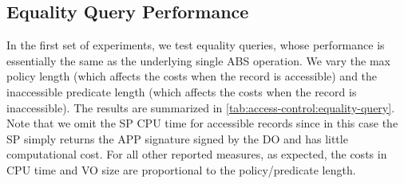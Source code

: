 \subsection{Equality Query Performance}

\begin{table}[t]
    \centering
    \caption{Equality Query Performance}\label{tab:access-control:equality-query}
\end{table}

In the first set of experiments, we test equality queries, whose performance is essentially the same as the underlying single ABS operation. We vary the max policy length (which affects the costs when the record is accessible) and the inaccessible predicate length (which affects the costs when the record is inaccessible). The results are summarized in \cref{tab:access-control:equality-query}. Note that we omit the SP CPU time for accessible records since in this case the SP simply returns the APP signature signed by the DO and has little computational cost. For all other reported measures, as expected, the costs in CPU time and VO size are proportional to the policy/predicate length.

